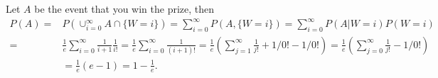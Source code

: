 
\setcounter{theorem}{69}
\begin{exercise} [BH.4.70]
\begin{solution}
    Let $A$ be the event that you win the prize, then
	\begin{align*}
		P(A)=& P(\cup_{i=0}^\infty A\cap \{W=i\})=\sum_{i=0}^\infty  P( A, \{W=i\})=\sum_{i=0}^\infty  P( A|W=i)P(W=i)\\
		=& \frac{1}{e} \sum_{i=0}^\infty \frac{1}{i+1}\frac{1}{i!} =\frac{1}{e} \sum_{i=0}^\infty \frac{1}{(i+1)!}=\frac{1}{e} (\sum_{j=1}^\infty \frac{1}{j!}+1/0!-1/0!)=\frac{1}{e} (\sum_{j=0}^\infty \frac{1}{j!}-1/0!)\\&=\frac{1}{e} (e-1)=1-\frac{1}{e}. 
	\end{align*}
\end{solution}
\end{exercise}

